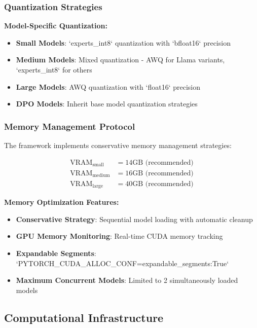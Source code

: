 \subsubsection{Quantization Strategies}

\textbf{Model-Specific Quantization:}
\begin{itemize}
    \item \textbf{Small Models}: `experts\_int8` quantization with `bfloat16` precision
    \item \textbf{Medium Models}: Mixed quantization - AWQ for Llama variants, `experts\_int8` for others
    \item \textbf{Large Models}: AWQ quantization with `float16` precision
    \item \textbf{DPO Models}: Inherit base model quantization strategies
\end{itemize}

\subsubsection{Memory Management Protocol}

The framework implements conservative memory management strategies:

\begin{align}
\text{VRAM}_{\text{small}} &= 14\text{GB (recommended)} \\
\text{VRAM}_{\text{medium}} &= 16\text{GB (recommended)} \\
\text{VRAM}_{\text{large}} &= 40\text{GB (recommended)}
\end{align}

\textbf{Memory Optimization Features:}
\begin{itemize}
    \item \textbf{Conservative Strategy}: Sequential model loading with automatic cleanup
    \item \textbf{GPU Memory Monitoring}: Real-time CUDA memory tracking
    \item \textbf{Expandable Segments}: `PYTORCH\_CUDA\_ALLOC\_CONF=expandable\_segments:True`
    \item \textbf{Maximum Concurrent Models}: Limited to 2 simultaneously loaded models
\end{itemize}

\subsection{Computational Infrastructure}
\label{subsec:computational-infrastructure}

